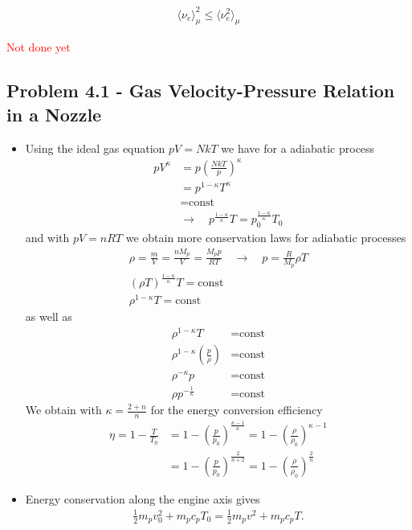 \documentclass[10pt,a4paper]{book}
\theoremstyle{definition}
\begin{document}
\begin{align}
    \langle \nu_e\rangle_\mu^2\le\langle \nu_e^2\rangle_\mu    
\end{align}

\textcolor{red}{Not done yet}

\subsection{Problem 4.1 - Gas Velocity-Pressure Relation in a Nozzle}
\begin{itemize}
\item Using the ideal gas equation $pV=NkT$ we have for a adiabatic process
\begin{align}
    pV^\kappa&=p\left(\frac{NkT}{p}\right)^\kappa\\
    &=p^{1-\kappa}T^\kappa\\
    &=\text{const}\\
    &\rightarrow\quad p^\frac{1-\kappa}{\kappa}T=p_0^\frac{1-\kappa}{\kappa}T_0
\end{align}
and with $pV=nRT$ we obtain more conservation laws for adiabatic processes
\begin{align}
    \rho=\frac{m}{V}=\frac{nM_p}{V}=\frac{M_pp}{RT}\quad\rightarrow\quad p=\frac{R}{M_p}\rho T\\
    (\rho T)^\frac{1-\kappa}{\kappa}T=\text{const}\\
    \rho^{1-\kappa}T=\text{const}
\end{align}
as well as
\begin{align}
    \rho^{1-\kappa}T&=\text{const}\\
    \rho^{1-\kappa}\left(\frac{p}{\rho}\right)&=\text{const}\\
    \rho^{-\kappa}p&=\text{const}\\
    \rho p^{-\frac{1}{\kappa}}&=\text{const}
\end{align}
We obtain with $\kappa=\frac{2+n}{n}$ for the energy conversion efficiency 
\begin{align}
    \eta=1-\frac{T}{T_0}&=1-\left(\frac{p}{p_0}\right)^\frac{\kappa-1}{\kappa}=1-\left(\frac{\rho}{\rho_0}\right)^{\kappa-1}\\
    &=1-\left(\frac{p}{p_0}\right)^\frac{2}{n+2}=1-\left(\frac{\rho}{\rho_0}\right)^\frac{2}{n}
\end{align}
\item Energy conservation along the engine axis gives
\begin{align}
    \frac{1}{2}m_pv_0^2+m_pc_pT_0=\frac{1}{2}m_pv^2+m_pc_pT.

\end{align}
\end{itemize}
\end{document}

